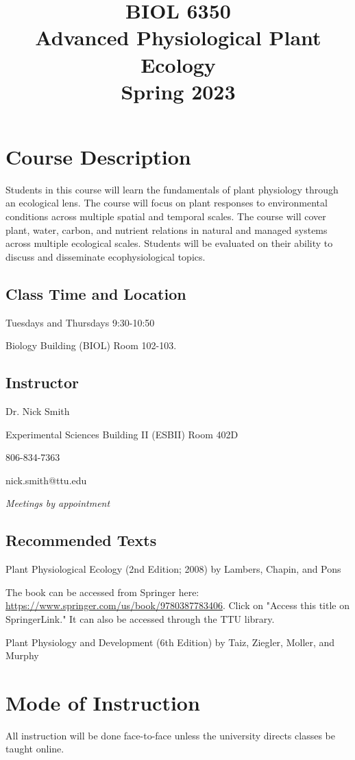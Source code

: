 \documentclass[12pt, notitlepage]{article}   	%
\title{
	\textbf{
		BIOL 6350
	} \\
	\large Advanced Physiological Plant Ecology \\
	\large Spring 2023
}
\date{\vspace{-5ex}}
\begin{document}
{\selectfont %

\maketitle

\section{Course Description}
Students in this course will learn the fundamentals of plant physiology through 
an ecological lens. The course will focus on plant responses to environmental conditions 
across multiple spatial and temporal scales. The course will cover plant, water, carbon, 
and nutrient relations in natural and managed systems across multiple ecological scales. 
Students will be evaluated on their 
ability to discuss and disseminate ecophysiological topics.

\subsection{Class Time and Location}
Tuesdays and Thursdays 9:30-10:50

Biology Building (BIOL) Room 102-103.

\subsection{Instructor}
Dr. Nick Smith \par
Experimental Sciences Building II (ESBII) Room 402D \par
806-834-7363 \par
nick.smith@ttu.edu \par
\textit{Meetings by appointment}

\subsection{Recommended Texts}
Plant Physiological Ecology (2nd Edition; 2008) by Lambers, Chapin, and Pons \par
The book can be accessed from Springer here: 
\url{https://www.springer.com/us/book/9780387783406}. Click on "Access this title on 
SpringerLink." It can also be accessed through the TTU library. \par
Plant Physiology and Development (6th Edition) by Taiz, Ziegler, Moller, and Murphy

\section{Mode of Instruction}
All instruction will be done face-to-face unless the university directs classes be 
taught online.

}
\end{document}
